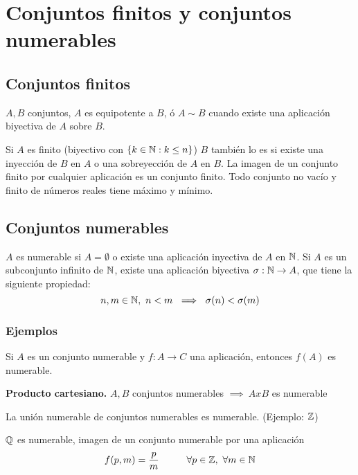 \section{Conjuntos finitos y conjuntos numerables}
\subsection{Conjuntos finitos}
$A,B$ conjuntos, $A$ es equipotente a $B$, ó $A\sim B$ cuando
existe una aplicación biyectiva de $A$ sobre $B$. 

Si $A$ es finito (biyectivo con $\{k\in\mathbb{N} : k\leq n\}$)  $B$ también lo es si existe una inyección de $B$ en $A$ o una sobreyección de $A$ en $B$.
La imagen de un conjunto finito por cualquier aplicación es un conjunto finito.
Todo conjunto no vacío y finito de números reales tiene máximo y mínimo.

\subsection{Conjuntos numerables}
$A$ es numerable si $A=\emptyset$ o existe una aplicación inyectiva de $A$ en $\mathbb{N}$. 
Si $A$ es un subconjunto infinito de $\mathbb{N}$, existe una aplicación biyectiva $\sigma : \mathbb{N} \rightarrow A$, que tiene la siguiente propiedad:
$$ n,m\in\mathbb{N}, \ n<m \ \implies \ \sigma (n) < \sigma (m) $$

\subsubsection{Ejemplos}
Si $A$ es un conjunto numerable y $f:A \rightarrow C$ una aplicación, entonces $f(A)$ es numerable.

\textbf{Producto cartesiano.} $A,B$ conjuntos numerables $\implies \ AxB$ es numerable

La unión numerable de conjuntos numerables es numerable. (Ejemplo: $\mathbb{Z}$)

$\mathbb{Q}$ es numerable, imagen de un conjunto numerable por una aplicación
$$ f(p,m) = \frac{p}{m} \hspace{1cm} \forall p\in\mathbb{Z} , \ \forall m\in\mathbb{N}$$ 